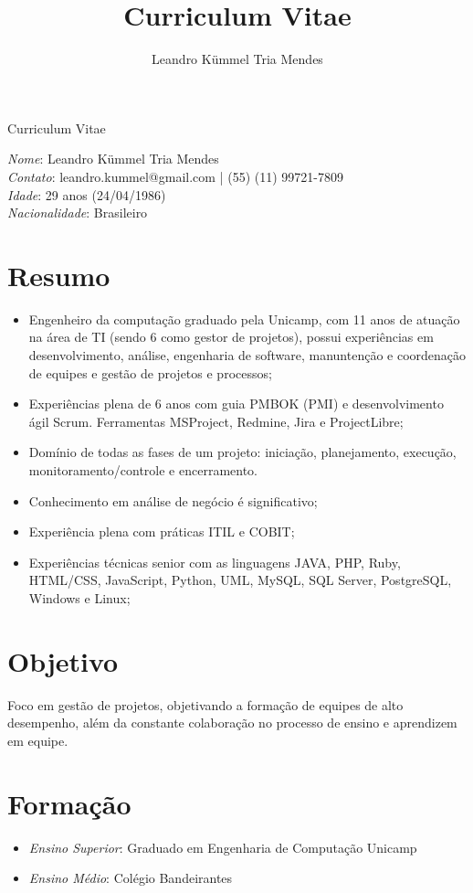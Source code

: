 \documentclass[a4paper,11pt]{article}
\title{Curriculum Vitae}
\author{Leandro Kümmel Tria Mendes}
\begin{document}
\begin{center} 
Curriculum Vitae
\end{center} 
\emph{Nome}: Leandro Kümmel Tria Mendes\\
\emph{Contato}: leandro.kummel@gmail.com | (55) (11) 99721-7809\\
\emph{Idade}: 29 anos (24/04/1986)\\
\emph{Nacionalidade}: Brasileiro\\
\section{Resumo}
\begin{itemize}
\item Engenheiro da computação graduado pela Unicamp, com 11 anos de atuação na área de TI (sendo 6 como gestor de projetos), possui experiências em desenvolvimento, análise, engenharia de software, manuntenção e coordenação de equipes e gestão de projetos e processos;
\item Experiências plena de 6 anos com guia PMBOK (PMI) e desenvolvimento ágil Scrum. Ferramentas MSProject, Redmine, Jira e ProjectLibre;
\item Domínio de todas as fases de um projeto: iniciação, planejamento, execução, monitoramento/controle e encerramento.
\item Conhecimento em análise de negócio é significativo;
\item Experiência plena com práticas ITIL e COBIT;
\item Experiências técnicas senior com as linguagens JAVA, PHP, Ruby, HTML/CSS, JavaScript, Python, UML, MySQL, SQL Server, PostgreSQL, Windows e Linux;
\end{itemize}
\section{Objetivo}

  Foco em gestão de projetos, objetivando a formação de equipes de alto desempenho, além da constante colaboração no processo de ensino e aprendizem em equipe. 
\section{Formação}
\begin{itemize}
\item \emph{Ensino Superior}: Graduado em Engenharia de Computação Unicamp 
\item \emph{Ensino Médio}: Colégio Bandeirantes

\end{itemize}
\end{document}
